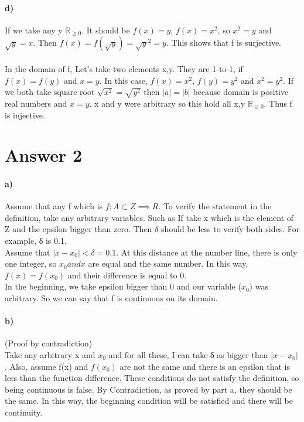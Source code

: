 \documentclass[12pt]{article}
\begin{document}
\paragraph{d)} If we take any y \in $\mathbb R_{\ge 0}$. It should be $f(x) = y$, $f(x) = x^2$, so $x^2 = y$ and $\sqrt{y} = x$. Then $f(x) = f(\sqrt{y}) = \sqrt{y}^2 = y$. This shows that f is surjective. \\
\\
In the domain of f, Let's take two elements x,y. They are 1-to-1, if $f(x) = f(y)$ and $x = y$. \hspace  In this case, $f(x) = x^2$, $f(y) = y^2$ and $x^2 = y^2$. If we both take square root $\sqrt{x^2} = \sqrt{y^2}$ then $|a| = |b|$ because domain is positive real numbers and $x=y$. x and y were arbitrary so this hold all \forall x,y \in $\mathbb R_{\ge 0}$. Thus f is injective.

\section*{Answer 2}
\paragraph{a)}
Assume that any f which is $f: A \subset Z \implies R$. To verify the statement in the definition, take any arbitrary variables. Such as If take x which is the element of Z and the epsilon bigger than zero. Then $δ $ should be less to verify both sides. For example, δ is 0.1. \\

Assume that $|x - x_0|<δ=0.1$. At this distance at the number line, there is only one integer, so $x_0 and x$ are equal and the same number. In this way, $f(x) = f(x_0)$ and their difference is equal to 0. \\
In the beginning, we take epsilon bigger than 0 and our variable ($x_0$) was arbitrary. So we can say that f is continuous on its domain. 
\paragraph{b)} (Proof by contradiction) \\
Take any arbitrary x and $x_0$ and for all these, I can take δ as bigger than $|x - x_0|$. Also, assume f(x) and $f(x_0)$ are not the same and there is an epsilon that is less than  the function difference. These conditions do not satisfy the definition, so being continuous is false. By Contradiction, as proved by part a, they should be the same. In this way, the beginning condition will be satisfied and there will be continuity.
\end{document}
